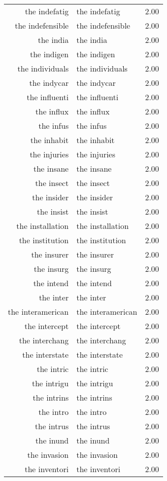 \begin{table}[ht]
\begin{tabular}{rlr}
  the indefatig & the indefatig & 2.00 \\ 
  the indefensible & the indefensible & 2.00 \\ 
  the india & the india & 2.00 \\ 
  the indigen & the indigen & 2.00 \\ 
  the individuals & the individuals & 2.00 \\ 
  the indycar & the indycar & 2.00 \\ 
  the influenti & the influenti & 2.00 \\ 
  the influx & the influx & 2.00 \\ 
  the infus & the infus & 2.00 \\ 
  the inhabit & the inhabit & 2.00 \\ 
  the injuries & the injuries & 2.00 \\ 
  the insane & the insane & 2.00 \\ 
  the insect & the insect & 2.00 \\ 
  the insider & the insider & 2.00 \\ 
  the insist & the insist & 2.00 \\ 
  the installation & the installation & 2.00 \\ 
  the institution & the institution & 2.00 \\ 
  the insurer & the insurer & 2.00 \\ 
  the insurg & the insurg & 2.00 \\ 
  the intend & the intend & 2.00 \\ 
  the inter & the inter & 2.00 \\ 
  the interamerican & the interamerican & 2.00 \\ 
  the intercept & the intercept & 2.00 \\ 
  the interchang & the interchang & 2.00 \\ 
  the interstate & the interstate & 2.00 \\ 
  the intric & the intric & 2.00 \\ 
  the intrigu & the intrigu & 2.00 \\ 
  the intrins & the intrins & 2.00 \\ 
  the intro & the intro & 2.00 \\ 
  the intrus & the intrus & 2.00 \\ 
  the inund & the inund & 2.00 \\ 
  the invasion & the invasion & 2.00 \\ 
  the inventori & the inventori & 2.00 \\ 

\end{tabular}
\end{table}
